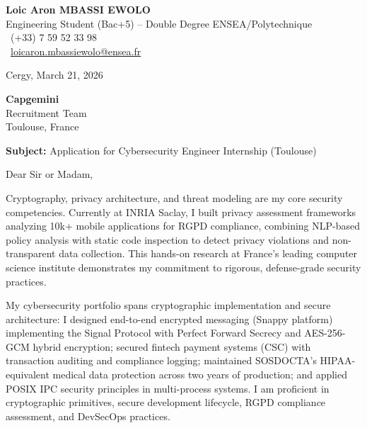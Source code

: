 \documentclass[a4paper,11pt]{article}
\begin{document}
\noindent
\begin{minipage}[t]{0.5\textwidth}
    \textbf{Loic Aron MBASSI EWOLO}\\
    Engineering Student (Bac+5) -- Double Degree ENSEA/Polytechnique\\[3pt]
    \Mobilefone\ (+33) 7 59 52 33 98\\
    \Letter\ \href{mailto:loicaron.mbassiewolo@ensea.fr}{loicaron.mbassiewolo@ensea.fr}
\end{minipage}
\hfill
\begin{minipage}[t]{0.4\textwidth}
    \raggedleft
    Cergy, March 21, 2026
\end{minipage}

\vspace{1.2cm}

\hfill
\begin{minipage}[t]{0.5\textwidth}
    \raggedleft
    \textbf{Capgemini} \\
    Recruitment Team \\
    Toulouse, France
\end{minipage}

\vspace{1cm}

\noindent\textbf{Subject:} Application for Cybersecurity Engineer Internship (Toulouse)

\vspace{0.8cm}

Dear Sir or Madam,

Cryptography, privacy architecture, and threat modeling are my core security competencies. Currently at INRIA Saclay, I built privacy assessment frameworks analyzing 10k+ mobile applications for RGPD compliance, combining NLP-based policy analysis with static code inspection to detect privacy violations and non-transparent data collection. This hands-on research at France's leading computer science institute demonstrates my commitment to rigorous, defense-grade security practices.

My cybersecurity portfolio spans cryptographic implementation and secure architecture: I designed end-to-end encrypted messaging (Snappy platform) implementing the Signal Protocol with Perfect Forward Secrecy and AES-256-GCM hybrid encryption; secured fintech payment systems (CSC) with transaction auditing and compliance logging; maintained SOSDOCTA's HIPAA-equivalent medical data protection across two years of production; and applied POSIX IPC security principles in multi-process systems. I am proficient in cryptographic primitives, secure development lifecycle, RGPD compliance assessment, and DevSecOps practices.
\end{document}

